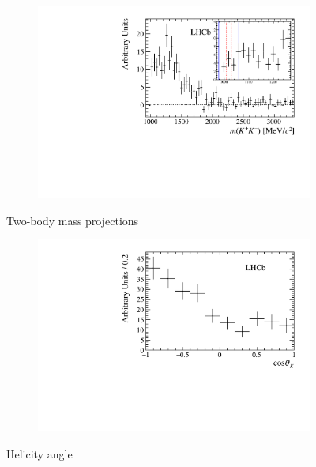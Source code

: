 \begin{figure}[!h]
\begin{subfigure}[t]{0.49\textwidth}
        \includegraphics[width=1.0\textwidth]{figs/B2DsKK/phi_mass_sweighted.pdf}
    \end{subfigure}
    \caption{Two-body mass projections}
    \label{fig:B2DsKK_twobodyprojections}
\end{figure}



\begin{figure}[!h]
    \centering
    \begin{subfigure}[t]{0.59\textwidth}
        \includegraphics[width=1.0\textwidth]{figs/B2DsKK/helAngle_sweighted.pdf}
    \end{subfigure}
    \caption{Helicity angle}
    \label{fig:B2DsKK_twobodyprojections}
\end{figure}



